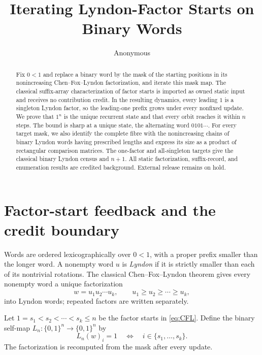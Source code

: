\documentclass[10pt,a4paper]{amsart}
\title[Lyndon-factor-start feedback]{Iterating Lyndon-Factor Starts on Binary Words}
\author{Anonymous}
\date{}
\theoremstyle{definition}
\theoremstyle{remark}
\newcommand{\Bn}{\{0,1\}^n}
\begin{document}
\begin{abstract}
Fix $0<1$ and replace a binary word by the mask of the starting positions in
its nonincreasing Chen--Fox--Lyndon factorization, and iterate this mask map.
The classical suffix-array characterization of factor starts is imported as
owned static input and receives no contribution credit.  In the resulting
dynamics, every leading $1$ is a singleton Lyndon factor, so the leading-one
prefix grows under every nonfixed update.  We prove that $1^n$ is the unique
recurrent state and that every orbit reaches it within $n$ steps.  The bound
is sharp at a unique state, the alternating word $0101\cdots$.  For every
target mask, we also identify the complete fibre with the nonincreasing
chains of binary Lyndon words having prescribed lengths and express its size
as a product of rectangular comparison matrices.  The one-factor and
all-singleton targets give the classical binary Lyndon census and $n+1$.
All static factorization, suffix-record, and enumeration results are credited
background.  External release remains on hold.
\end{abstract}

\maketitle

\section{Factor-start feedback and the credit boundary}

Words are ordered lexicographically over $0<1$, with a proper prefix smaller
than the longer word.  A nonempty word $u$ is \emph{Lyndon} if it is strictly
smaller than each of its nontrivial rotations.  The classical
Chen--Fox--Lyndon theorem \cite{ChenFoxLyndon1958} gives every nonempty word a
unique factorization
\begin{equation}\label{eq:CFL}
 w=u_1u_2\cdots u_k,\qquad u_1\ge u_2\ge\cdots\ge u_k,
\end{equation}
into Lyndon words; repeated factors are written separately.

Let $1=s_1<s_2<\cdots<s_k\le n$ be the factor starts in \eqref{eq:CFL}.  Define
the binary self-map $L_n:\Bn\to\Bn$ by
\begin{equation}\label{eq:map}
 L_n(w)_i=1\quad\Longleftrightarrow\quad i\in\{s_1,\ldots,s_k\}.
\end{equation}
The factorization is recomputed from the mask after every update.
\end{document}
